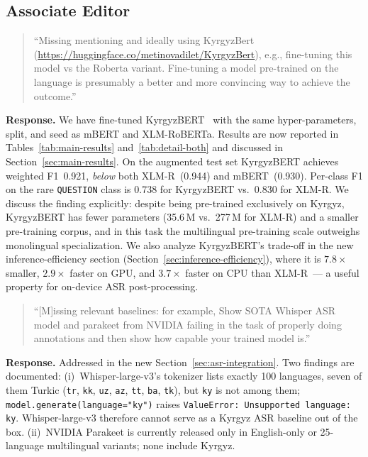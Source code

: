 \documentclass[manuscript, review]{acmart}
\begin{document}
\subsection*{Associate Editor}

\begin{quote}
``Missing mentioning and ideally using KyrgyzBert (\url{https://huggingface.co/metinovadilet/KyrgyzBert}), e.g., fine-tuning this model vs the Roberta variant. Fine-tuning a model pre-trained on the language is presumably a better and more convincing way to achieve the outcome.''
\end{quote}

\noindent\textbf{Response.} We have fine-tuned KyrgyzBERT~\cite{metinov2025kyrgyzbert} with the same hyper-parameters, split, and seed as mBERT and XLM-RoBERTa. Results are now reported in Tables~\ref{tab:main-results} and~\ref{tab:detail-both} and discussed in Section~\ref{sec:main-results}. On the augmented test set KyrgyzBERT achieves weighted F1~0.921, \emph{below} both XLM-R~(0.944) and mBERT~(0.930). Per-class F1 on the rare \texttt{QUESTION} class is 0.738 for KyrgyzBERT vs.\ 0.830 for XLM-R. We discuss the finding explicitly: despite being pre-trained exclusively on Kyrgyz, KyrgyzBERT has fewer parameters (35.6\,M vs.\ 277\,M for XLM-R) and a smaller pre-training corpus, and in this task the multilingual pre-training scale outweighs monolingual specialization. We also analyze KyrgyzBERT's trade-off in the new inference-efficiency section (Section~\ref{sec:inference-efficiency}), where it is $7.8\times$ smaller, $2.9\times$ faster on GPU, and $3.7\times$ faster on CPU than XLM-R~--- a useful property for on-device ASR post-processing.

\begin{quote}
``[M]issing relevant baselines: for example, Show SOTA Whisper ASR model and parakeet from NVIDIA failing in the task of properly doing annotations and then show how capable your trained model is.''
\end{quote}

\noindent\textbf{Response.} Addressed in the new Section~\ref{sec:asr-integration}. Two findings are documented: (i)~Whisper-large-v3's tokenizer lists exactly 100 languages, seven of them Turkic (\texttt{tr}, \texttt{kk}, \texttt{uz}, \texttt{az}, \texttt{tt}, \texttt{ba}, \texttt{tk}), but \texttt{ky} is not among them; \texttt{model.generate(language="ky")} raises \texttt{ValueError: Unsupported language: ky}. Whisper-large-v3 therefore cannot serve as a Kyrgyz ASR baseline out of the box. (ii)~NVIDIA Parakeet is currently released only in English-only or 25-language multilingual variants; none include Kyrgyz.
\end{document}
